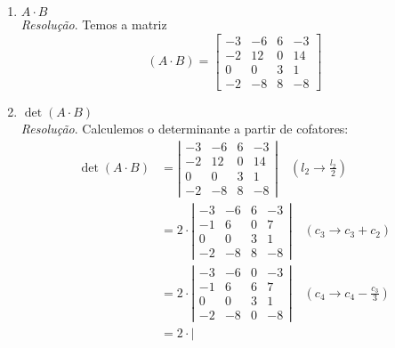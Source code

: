 \begin{enumerate}
    \item $A \cdot B$ \\
    \emph{Resolução}. Temos a matriz
    \begin{displaymath}
        (A \cdot B) = \left[
            \begin{array}{cccc}
                -3 & -6 & 6 & -3 \\
                -2 & 12 & 0 & 14 \\
                0 & 0 & 3 & 1 \\ 
                -2 & -8 & 8 & -8
            \end{array}
        \right]
    \end{displaymath}
    \item $\det (A \cdot B)$ \\
    \emph{Resolução}. Calculemos o determinante a partir de cofatores:
    \begin{align*}
        \det (A \cdot B) &= \left|
            \begin{array}{cccc}
                -3 & -6 & 6 & -3 \\
                -2 & 12 & 0 & 14 \\
                0 & 0 & 3 & 1 \\ 
                -2 & -8 & 8 & -8
            \end{array}
        \right| \quad (l_2 \rightarrow \frac{l_2}{2}) \\ &=
        2 \cdot \left|
            \begin{array}{cccc}
                -3 & -6 & 6 & -3 \\
                -1 & 6 & 0 & 7 \\
                0 & 0 & 3 & 1 \\ 
                -2 & -8 & 8 & -8
            \end{array} 
        \right| \quad (c_3 \rightarrow c_3 + c_2) \\ &=
        2 \cdot \left|
            \begin{array}{cccc}
                -3 & -6 & 0 & -3 \\
                -1 & 6 & 6 & 7 \\
                0 & 0 & 3 & 1 \\ 
                -2 & -8 & 0 & -8
            \end{array} 
        \right| \quad (c_4 \rightarrow c_4 - \frac{c_3}{3}) \\ &=
        2 \cdot \left|
            \begin{array}{cccc}

\end{array}
\end{align*}
\end{enumerate}
